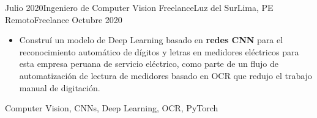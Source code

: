 \begin{experiences}
\emptySeparator
\experience
  {Julio 2020}{Ingeniero de Computer Vision Freelance}{Luz del Sur}{Lima, PE}
  {Remoto}{Freelance}
  {Octubre 2020} {
    \begin{itemize}
      \item Construí un modelo de Deep Learning basado en \textbf{redes CNN} para el reconocimiento automático de dígitos y letras en medidores eléctricos para esta empresa peruana de servicio eléctrico, como parte de un flujo de automatización de lectura de medidores basado en OCR que redujo el trabajo manual de digitación.
    \end{itemize}
  }
  {Computer Vision, CNNs, Deep Learning, OCR, PyTorch}
\end{experiences}
